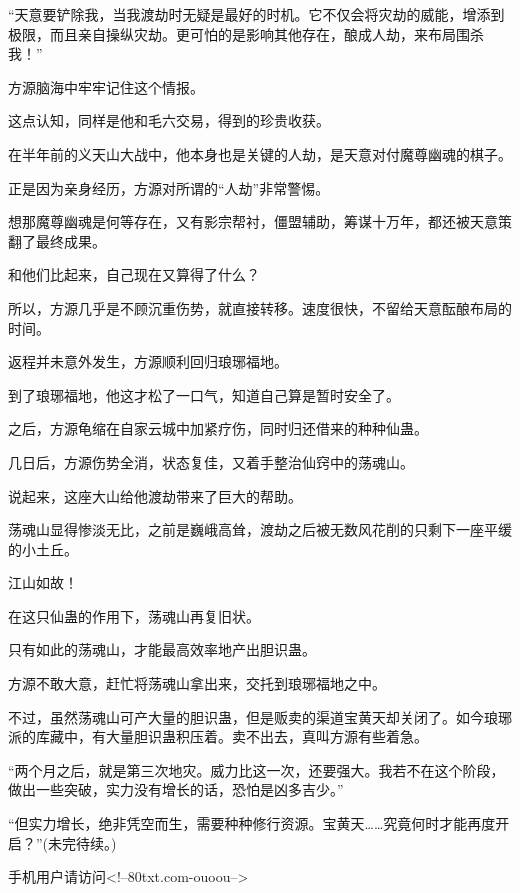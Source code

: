 \begin{this_body}
“天意要铲除我，当我渡劫时无疑是最好的时机。它不仅会将灾劫的威能，增添到极限，而且亲自操纵灾劫。更可怕的是影响其他存在，酿成人劫，来布局围杀我！”

方源脑海中牢牢记住这个情报。

这点认知，同样是他和毛六交易，得到的珍贵收获。

在半年前的义天山大战中，他本身也是关键的人劫，是天意对付魔尊幽魂的棋子。

正是因为亲身经历，方源对所谓的“人劫”非常警惕。

想那魔尊幽魂是何等存在，又有影宗帮衬，僵盟辅助，筹谋十万年，都还被天意策翻了最终成果。

和他们比起来，自己现在又算得了什么？

所以，方源几乎是不顾沉重伤势，就直接转移。速度很快，不留给天意酝酿布局的时间。

返程并未意外发生，方源顺利回归琅琊福地。

到了琅琊福地，他这才松了一口气，知道自己算是暂时安全了。

之后，方源龟缩在自家云城中加紧疗伤，同时归还借来的种种仙蛊。

几日后，方源伤势全消，状态复佳，又着手整治仙窍中的荡魂山。

说起来，这座大山给他渡劫带来了巨大的帮助。

荡魂山显得惨淡无比，之前是巍峨高耸，渡劫之后被无数风花削的只剩下一座平缓的小土丘。

江山如故！

在这只仙蛊的作用下，荡魂山再复旧状。

只有如此的荡魂山，才能最高效率地产出胆识蛊。

方源不敢大意，赶忙将荡魂山拿出来，交托到琅琊福地之中。

不过，虽然荡魂山可产大量的胆识蛊，但是贩卖的渠道宝黄天却关闭了。如今琅琊派的库藏中，有大量胆识蛊积压着。卖不出去，真叫方源有些着急。

“两个月之后，就是第三次地灾。威力比这一次，还要强大。我若不在这个阶段，做出一些突破，实力没有增长的话，恐怕是凶多吉少。”

“但实力增长，绝非凭空而生，需要种种修行资源。宝黄天……究竟何时才能再度开启？”(未完待续。)

手机用户请访问<!--80txt.com-ouoou-->

\end{this_body}

